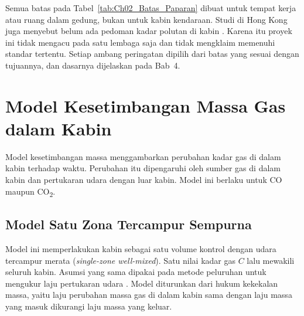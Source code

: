     Semua batas pada Tabel~\ref{tab:Ch02_Batas_Paparan} dibuat untuk tempat kerja atau ruang dalam gedung, bukan untuk kabin kendaraan. Studi di Hong Kong juga menyebut belum ada pedoman kadar polutan di kabin \cite{barnes2018}. Karena itu proyek ini tidak mengacu pada satu lembaga saja dan tidak mengklaim memenuhi standar tertentu. Setiap ambang peringatan dipilih dari batas yang sesuai dengan tujuannya, dan dasarnya dijelaskan pada Bab~4.


\section{Model Kesetimbangan Massa Gas dalam Kabin}
\label{sec:Model_Kesetimbangan_Gas}


    Model kesetimbangan massa menggambarkan perubahan kadar gas di dalam kabin terhadap waktu. Perubahan itu dipengaruhi oleh sumber gas di dalam kabin dan pertukaran udara dengan luar kabin. Model ini berlaku untuk CO maupun CO\textsubscript{2}.

    \subsection{Model Satu Zona Tercampur Sempurna}

    Model ini memperlakukan kabin sebagai satu volume kontrol dengan udara tercampur merata (\textit{single-zone well-mixed}). Satu nilai kadar gas $C$ lalu mewakili seluruh kabin. Asumsi yang sama dipakai pada metode peluruhan untuk mengukur laju pertukaran udara \cite{ashrae_co2}. Model diturunkan dari hukum kekekalan massa, yaitu laju perubahan massa gas di dalam kabin sama dengan laju massa yang masuk dikurangi laju massa yang keluar.

